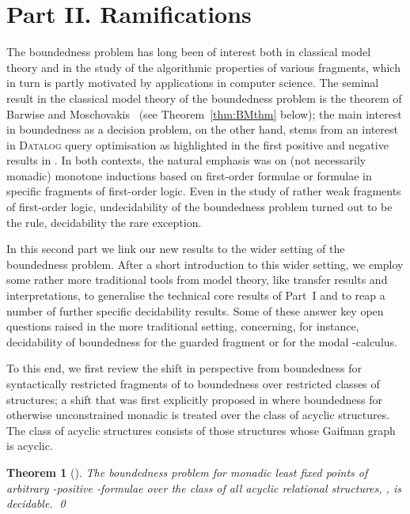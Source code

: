 \documentclass{LMCS}
\newtheorem*{thm*}{Theorem}
\begin{document}
\bigskip
\section*{Part II. Ramifications}


The boundedness problem has long been of interest
both in classical model theory and in the study of
the algorithmic properties of various fragments,
which in turn is partly motivated by applications
in computer science. The seminal result in the classical
model theory of the boundedness problem 
is the theorem of Barwise and Moschovakis~\cite{BarwiseMoschovakis78}
(see Theorem~\ref{thm:BMthm} below)\?;
the main interest in boundedness as a decision problem,
on the other hand, stems from an interest in \textsc{Datalog}
query optimisation as highlighted in the
first positive and negative results in
\cite{GaifmanMaSaVa93,HillebrandEtAl95}.
In both contexts, the natural emphasis
was on (not necessarily monadic) monotone inductions based on
first-order formulae or formulae in specific fragments of first-order
logic. Even in the study of rather weak fragments of first-order logic,
undecidability of the boundedness problem turned out to be the rule,
decidability the rare exception.


In this second part we link our new results to the wider setting
of the boundedness problem. After a short introduction to
this wider setting, we employ some rather more traditional tools
from model theory, like transfer results and interpretations,
to generalise the technical core results of Part~I and to
reap a number of further specific decidability results.
Some of these answer key open questions raised in the
more traditional setting, concerning, for instance, decidability
of boundedness for the guarded fragment or for the modal -calculus.


To this end, we first review the shift in perspective
from boundedness for syntactically restricted fragments of 
to boundedness over restricted classes of structures\?;
a shift that was first explicitly proposed in \cite{KOS}
where boundedness for otherwise unconstrained monadic 
is treated over the class of acyclic structures.
The class  of acyclic structures consists of those
structures whose Gaifman graph is acyclic.

\begin{thm*}[\cite{KOS}]
The boundedness problem for monadic least fixed points
of arbitrary -positive -formulae over the class of all
acyclic relational structures, , is decidable.
\qed\end{thm*}
\end{document}
